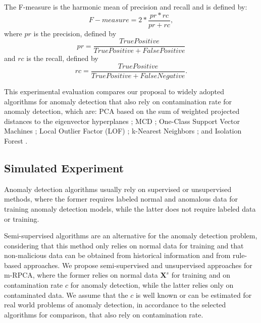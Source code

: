 The F-measure is the harmonic mean of precision and recall and is defined by:
\begin{equation}\label{eq:4.15}
	F-measure = 2 * \frac{pr * rc}{pr + rc},
\end{equation}
where $pr$ is the precision, defined by 
\begin{equation}\label{eq:4.16}
	pr = \frac{True Positive}{True Positive + False Positive}
\end{equation}
and $rc$ is the recall, defined by 
\begin{equation}\label{eq:4.17}
	rc = \frac{True Positive}{True Positive + False Negative}.
\end{equation}

This experimental evaluation compares our proposal to widely adopted algorithms for anomaly detection that also rely on contamination rate for anomaly detection, which are: PCA based on the sum of weighted projected distances to the eigenvector hyperplanes \cite{shyu2003novel}; MCD \cite{rousseeuw1984mcd,rousseeuw1999fastmcd}; One-Class Support Vector Machines \cite{scholkopf2001estimating}; Local Outlier Factor (LOF) \cite{breunig2000lof}; k-Nearest Neighbors \cite{angiulli2002fast}; and Isolation Forest \cite{liu2008isolation}.


\subsection{Simulated Experiment}
\label{sec:4_SimulatedScenario}

Anomaly detection algorithms usually rely on supervised or unsupervised methods, where the former requires labeled normal and anomalous data for training anomaly detection models, while the latter does not require labeled data or training. 

Semi-supervised algorithms are an alternative for the anomaly detection problem, considering that this method only relies on normal data for training and that non-malicious data can be obtained from historical information and from rule-based approaches. We propose semi-supervised and unsupervised approaches for m-RPCA, where the former relies on normal data $\boldsymbol{X}^s$ for training and on contamination rate $c$ for anomaly detection, while the latter relies only on contaminated data. We assume that the $c$ is well known or can be estimated for real world problems of anomaly detection, in accordance to the selected algorithms for comparison, that also rely on contamination rate.

